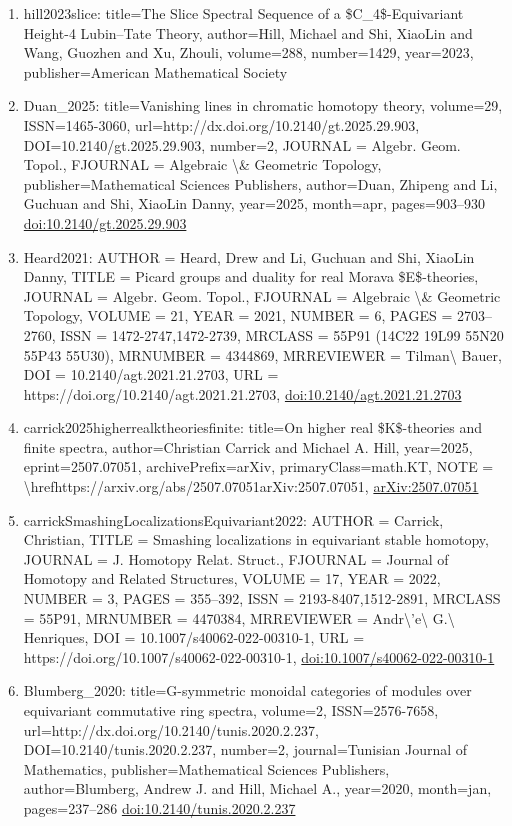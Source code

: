 \documentclass[11pt]{article}
\begin{document}
\begin{enumerate}[leftmargin=*]
  \item hill2023slice: title=The Slice Spectral Sequence of a \$C\_4\$-Equivariant Height-4 Lubin--Tate Theory, author=Hill, Michael and Shi, XiaoLin and Wang, Guozhen and Xu, Zhouli, volume=288, number=1429, year=2023, publisher=American Mathematical Society
  \item Duan\_2025: title=Vanishing lines in chromatic homotopy theory, volume=29, ISSN=1465-3060, url=http://dx.doi.org/10.2140/gt.2025.29.903, DOI=10.2140/gt.2025.29.903, number=2, JOURNAL = Algebr. Geom. Topol., FJOURNAL = Algebraic \textbackslash{}\& Geometric Topology, publisher=Mathematical Sciences Publishers, author=Duan, Zhipeng and Li, Guchuan and Shi, XiaoLin Danny, year=2025, month=apr, pages=903--930 \href{https://doi.org/10.2140/gt.2025.29.903}{doi:10.2140/gt.2025.29.903}
  \item Heard2021: AUTHOR = Heard, Drew and Li, Guchuan and Shi, XiaoLin Danny, TITLE = Picard groups and duality for real Morava \$E\$-theories, JOURNAL = Algebr. Geom. Topol., FJOURNAL = Algebraic \textbackslash{}\& Geometric Topology, VOLUME = 21, YEAR = 2021, NUMBER = 6, PAGES = 2703--2760, ISSN = 1472-2747,1472-2739, MRCLASS = 55P91 (14C22 19L99 55N20 55P43 55U30), MRNUMBER = 4344869, MRREVIEWER = Tilman\textbackslash{} Bauer, DOI = 10.2140/agt.2021.21.2703, URL = https://doi.org/10.2140/agt.2021.21.2703, \href{https://doi.org/10.2140/agt.2021.21.2703}{doi:10.2140/agt.2021.21.2703}
  \item carrick2025higherrealktheoriesfinite: title=On higher real \$K\$-theories and finite spectra, author=Christian Carrick and Michael A. Hill, year=2025, eprint=2507.07051, archivePrefix=arXiv, primaryClass=math.KT, NOTE = \textbackslash{}hrefhttps://arxiv.org/abs/2507.07051arXiv:2507.07051, \href{https://arxiv.org/abs/2507.07051}{arXiv:2507.07051}
  \item carrickSmashingLocalizationsEquivariant2022: AUTHOR = Carrick, Christian, TITLE = Smashing localizations in equivariant stable homotopy, JOURNAL = J. Homotopy Relat. Struct., FJOURNAL = Journal of Homotopy and Related Structures, VOLUME = 17, YEAR = 2022, NUMBER = 3, PAGES = 355--392, ISSN = 2193-8407,1512-2891, MRCLASS = 55P91, MRNUMBER = 4470384, MRREVIEWER = Andr\textbackslash{}'e\textbackslash{} G.\textbackslash{} Henriques, DOI = 10.1007/s40062-022-00310-1, URL = https://doi.org/10.1007/s40062-022-00310-1, \href{https://doi.org/10.1007/s40062-022-00310-1}{doi:10.1007/s40062-022-00310-1}
  \item Blumberg\_2020: title=G-symmetric monoidal categories of modules over equivariant commutative ring spectra, volume=2, ISSN=2576-7658, url=http://dx.doi.org/10.2140/tunis.2020.2.237, DOI=10.2140/tunis.2020.2.237, number=2, journal=Tunisian Journal of Mathematics, publisher=Mathematical Sciences Publishers, author=Blumberg, Andrew J. and Hill, Michael A., year=2020, month=jan, pages=237--286 \href{https://doi.org/10.2140/tunis.2020.2.237}{doi:10.2140/tunis.2020.2.237}

\end{enumerate}
\end{document}
